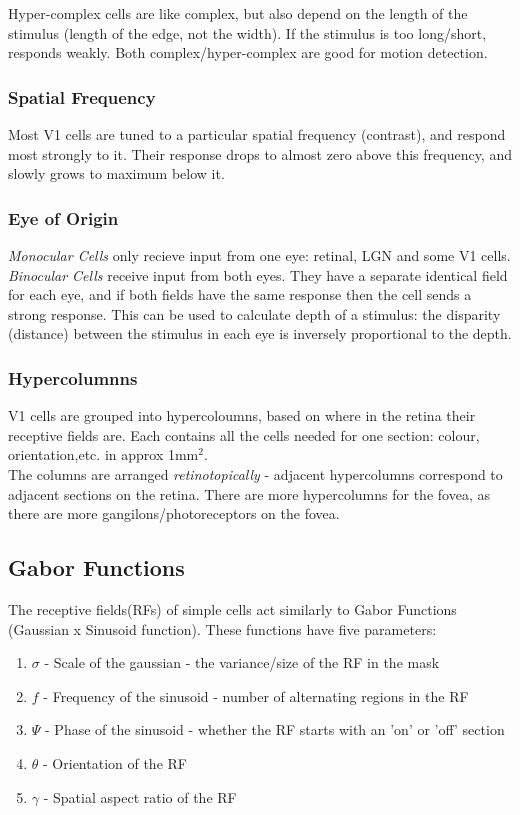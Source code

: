 Hyper-complex cells are like complex, but also depend on the length of the stimulus (length of the edge, not the width). If the stimulus is too long/short, responds weakly. Both complex/hyper-complex are good for motion detection.

\subsubsection{Spatial Frequency}
Most V1 cells are tuned to a particular spatial frequency (contrast), and respond most strongly to it. Their response drops to almost zero above this frequency, and slowly grows to maximum below it. 

\subsubsection{Eye of Origin}
\emph{Monocular Cells} only recieve input from one eye: retinal, LGN and some V1 cells.\\

\emph{Binocular Cells} receive input from both eyes. They have a separate identical field for each eye, and if both fields have the same response then the cell sends a strong response. This can be used to calculate depth of a stimulus: the disparity (distance) between the stimulus in each eye is inversely proportional to the depth. 

\subsubsection{Hypercolumnns}
V1 cells are grouped into hypercoloumns, based on where in the retina their receptive fields are. Each contains all the cells needed for one section: colour, orientation,etc. in approx 1mm$^2$. \\

The columns are arranged \emph{retinotopically} - adjacent hypercolumns correspond to adjacent sections on the retina. There are more hypercolumns for the fovea, as there are more gangilons/photoreceptors on the fovea. 

\subsection{Gabor Functions}
The receptive fields(RFs) of simple cells act similarly to Gabor Functions (Gaussian x Sinusoid function). These functions have five parameters:
\begin{enumerate}
    \item $\sigma$ - Scale of the gaussian - the variance/size of the RF in the mask
    \item $f$ - Frequency of the sinusoid - number of alternating regions in the RF
    \item $\Psi$ - Phase of the sinusoid - whether the RF starts with an 'on' or 'off' section
    \item $\theta$ - Orientation of the RF 
    \item $\gamma$ - Spatial aspect ratio of the RF
\end{enumerate}


